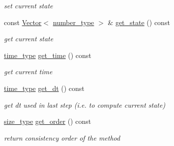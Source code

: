 \begin{DoxyCompactItemize}
\begin{DoxyCompactList}\small\item\em set current state \item\end{DoxyCompactList}\item 
\hypertarget{classhdnum_1_1RungeKutta4_a2769ffd570ccb23004b4996a4cebf279}{
const \hyperlink{classhdnum_1_1Vector}{Vector}$<$ \hyperlink{classhdnum_1_1RungeKutta4_a8a2af290f6503769876570bba58fdff2}{number\_\-type} $>$ \& \hyperlink{classhdnum_1_1RungeKutta4_a2769ffd570ccb23004b4996a4cebf279}{get\_\-state} () const }
\label{classhdnum_1_1RungeKutta4_a2769ffd570ccb23004b4996a4cebf279}

\begin{DoxyCompactList}\small\item\em get current state \item\end{DoxyCompactList}\item 
\hypertarget{classhdnum_1_1RungeKutta4_a371015562c4918d748b49df3c521b0d0}{
\hyperlink{classhdnum_1_1RungeKutta4_accd5f055f7a407e0012622fbf4298e84}{time\_\-type} \hyperlink{classhdnum_1_1RungeKutta4_a371015562c4918d748b49df3c521b0d0}{get\_\-time} () const }
\label{classhdnum_1_1RungeKutta4_a371015562c4918d748b49df3c521b0d0}

\begin{DoxyCompactList}\small\item\em get current time \item\end{DoxyCompactList}\item 
\hypertarget{classhdnum_1_1RungeKutta4_aa808a6a3dfd672359999e44906da4692}{
\hyperlink{classhdnum_1_1RungeKutta4_accd5f055f7a407e0012622fbf4298e84}{time\_\-type} \hyperlink{classhdnum_1_1RungeKutta4_aa808a6a3dfd672359999e44906da4692}{get\_\-dt} () const }
\label{classhdnum_1_1RungeKutta4_aa808a6a3dfd672359999e44906da4692}

\begin{DoxyCompactList}\small\item\em get dt used in last step (i.e. to compute current state) \item\end{DoxyCompactList}\item 
\hypertarget{classhdnum_1_1RungeKutta4_a74544dbe43813719b549d97903772a52}{
\hyperlink{classhdnum_1_1RungeKutta4_a35c0f2a31327913676b7287fb1ef23dc}{size\_\-type} \hyperlink{classhdnum_1_1RungeKutta4_a74544dbe43813719b549d97903772a52}{get\_\-order} () const }
\label{classhdnum_1_1RungeKutta4_a74544dbe43813719b549d97903772a52}

\begin{DoxyCompactList}\small\item\em return consistency order of the method \item\end{DoxyCompactList}\end{DoxyCompactItemize}


